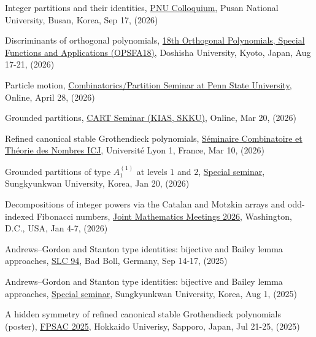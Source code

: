 \documentclass[letterpaper]{article}
\begin{document}
\begin{etaremune}
\item Integer partitions and their identities, \href{https://math.pusan.ac.kr/math/11256/subview.do?enc=Zm5jdDF8QEB8JTJGYmJzJTJGbWF0aCUyRjE0MDElMkYxNDYyNzE1JTJGYXJ0Y2xWaWV3LmRvJTNGcGFnZSUzRDElMjZmaW5kVHlwZSUzRCUyNmZpbmRXb3JkJTNEJTI2ZmluZENsU2VxJTNEJTI2ZmluZE9wbndyZCUzRCUyNnJnc0JnbmRlU3RyJTNEJTI2cmdzRW5kZGVTdHIlM0QlMjZwYXNzd29yZCUzRCUyNg%3D%3D}{PNU Colloquium}, Pusan National University, Busan, Korea, Sep 17, (2026)
\item Discriminants of orthogonal polynomials, \href{https://opsfa18.com/}{18th Orthogonal Polynomials, Special Functions and Applications (OPSFA18)}, Doshisha University, Kyoto, Japan, Aug 17-21, (2026)
\item Particle motion, \href{https://math-cal.cloud.science.psu.edu/events/84321}{Combinatorics/Partition Seminar at Penn State University}, Online, April 28, (2026)
\item Grounded partitions, \href{https://sites.google.com/view/cart-kias/}{CART Seminar (KIAS, SKKU)}, Online, Mar 20, (2026)
\item Refined canonical stable Grothendieck polynomials,
  \href{https://indico.math.cnrs.fr/event/15923/}{Séminaire Combinatoire et Théorie des Nombres ICJ}, Université Lyon 1, France, Mar 10, (2026)
\item Grounded partitions of type \( A_1^{(1)} \) at levels \( 1 \) and \( 2 \),  \href{https://math.skku.edu/math/community/seminar.do?mode=view&articleNo=211885&article.offset=0&articleLimit=10}{Special seminar}, Sungkyunkwan University, Korea, Jan 20, (2026)
\item Decompositions of integer powers via the Catalan and Motzkin arrays and odd-indexed Fibonacci numbers, \href{https://meetings.ams.org/math/jmm2026/meetingapp.cgi/Paper/54444}{Joint Mathematics Meetings 2026}, Washington, D.C., USA, Jan 4-7, (2026)
\item Andrews--Gordon and Stanton type identities: bijective and Bailey lemma approaches, \href{https://www.mat.univie.ac.at/~slc/wpapers/s94.html}{SLC 94}, Bad Boll, Germany, Sep 14-17, (2025)
\item Andrews--Gordon and Stanton type identities: bijective and Bailey lemma approaches, \href{https://math.skku.edu/math/community/seminar.do?mode=view&articleNo=204004&article.offset=0&articleLimit=10}{Special seminar}, Sungkyunkwan University, Korea, Aug 1, (2025)
\item A hidden symmetry of refined canonical stable Grothendieck polynomials (poster), \href{https://www.math.sci.hokudai.ac.jp/sympo/fpsac2025/}{FPSAC 2025}, Hokkaido Univerisy, Sapporo, Japan, Jul 21-25, (2025)

\end{etaremune}
\end{document}
